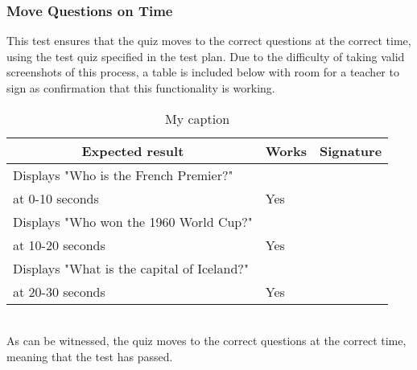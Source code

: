 \subsubsection{Move Questions on Time}
This test ensures that the quiz moves to the correct questions at the correct time, using the test quiz specified in the test plan. Due to the difficulty of taking valid screenshots of this process, a table is included below with room for a teacher to sign as confirmation that this functionality is working.

\begin{table}[]
\centering
\begin{tabular}{|l|l|l|}
\hline
\multicolumn{1}{|c|}{\textbf{Expected result}}              & \multicolumn{1}{c|}{\textbf{Works}} & \multicolumn{1}{c|}{\textbf{Signature}} \\ \hline
Displays "Who is the French Premier?"\\ at 0-10 seconds       & Yes                                 &                                         \\ \hline
Displays "Who won the 1960 World Cup?"\\ at 10-20 seconds     & Yes                                 &                                         \\ \hline
Displays "What is the capital of Iceland?"\\ at 20-30 seconds & Yes                                 &                                         \\ \hline
\end{tabular}
\caption{My caption}
\label{my-label}
\end{table}

\\As can be witnessed, the quiz moves to the correct questions at the correct time, meaning that the test has passed. 
